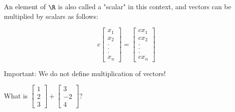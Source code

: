 	An element of $\R$ is also called a "scalar" in this context, and vectors can be multiplied by scalars as follows:
	
	$$ c\begin{bmatrix}
 		x_1\\
 		x_2\\
 		.\\
 		.\\
 		.\\
 		x_n
 	 \end{bmatrix} = 
 	 \begin{bmatrix}
 		cx_1\\
 		cx_2\\
 		.\\
 		.\\
 		.\\
 		cx_n
 	 \end{bmatrix}$$
 	 
 	Important:  We do not define multiplication of vectors!
 	
 	\begin{question}
 		What is $\begin{bmatrix}
 		1\\2\\3
 	 \end{bmatrix}+\begin{bmatrix}
 		3\\-2\\4
 	 \end{bmatrix}?$
 	
 	\end{question}
 	
